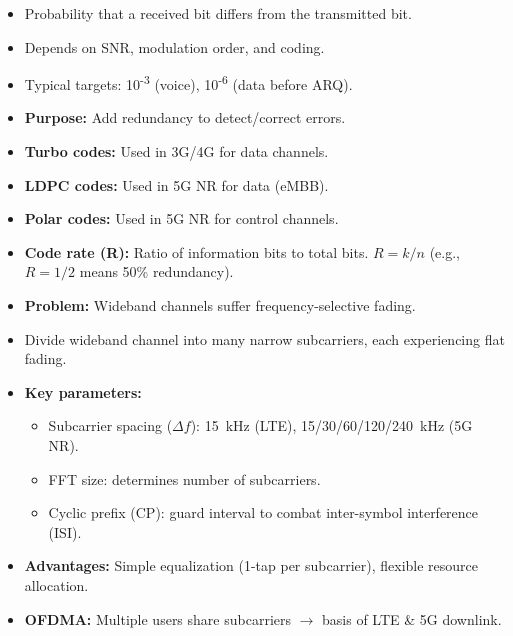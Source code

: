 

\CNchained{}

\begin{itemize}
\tightlist
\item
  Probability that a received bit differs from the transmitted bit.
\item
  Depends on SNR, modulation order, and coding.
\item
  Typical targets: 10\textsuperscript{-3} (voice), 10\textsuperscript{-6} (data before ARQ).
\end{itemize}


\begin{itemize}
\tightlist
\item
  \textbf{Purpose:} Add redundancy to detect/\allowbreak{}correct errors.
\item
  \textbf{Turbo codes:} Used in 3G/\allowbreak{}4G for data channels.
\item
  \textbf{LDPC codes:} Used in 5G NR for data (eMBB).
\item
  \textbf{Polar codes:} Used in 5G NR for control channels.
\item
  \textbf{Code rate (R):} Ratio of information bits to total bits. $R = k/n$ (e.g., $R = 1/2$ means 50\% redundancy).
\end{itemize}


\begin{itemize}
\tightlist
\item
  \textbf{Problem:} Wideband channels suffer frequency-selective fading.
\item
  \CNsolution{} Divide wideband channel into many narrow subcarriers, each experiencing flat fading.
\item
  \textbf{Key parameters:}

  \begin{itemize}
  \tightlist
  \item
    Subcarrier spacing ($\Delta f$): 15~kHz (LTE), 15/\allowbreak{}30/\allowbreak{}60/\allowbreak{}120/\allowbreak{}240~kHz (5G NR).
  \item
    FFT size: determines number of subcarriers.
  \item
    Cyclic prefix (CP): guard interval to combat inter-symbol interference (ISI).
  \end{itemize}
\item
  \textbf{Advantages:} Simple equalization (1-tap per subcarrier), flexible resource allocation.
\item
  \textbf{OFDMA:} Multiple users share subcarriers \ensuremath{\to} basis of LTE \& 5G downlink.
\end{itemize}

